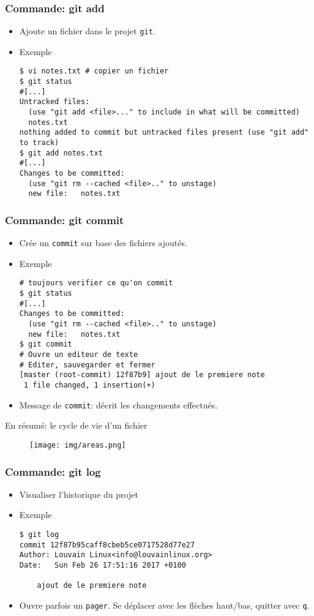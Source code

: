 \documentclass{beamer}
\begin{document}
\begin{frame}[fragile]
\frametitle{Commande: git add}
\begin{itemize}
    \item Ajoute un fichier dans le projet \texttt{git}.
    \item Exemple
\begin{lstlisting}
$ vi notes.txt # copier un fichier
$ git status
#[...]
Untracked files:
  (use "git add <file>..." to include in what will be committed)
  notes.txt
nothing added to commit but untracked files present (use "git add" to track)
$ git add notes.txt
#[...]
Changes to be committed:
  (use "git rm --cached <file>.." to unstage)
  new file:   notes.txt
\end{lstlisting}
\end{itemize}
\end{frame}

\begin{frame}[fragile]
\frametitle{Commande: git commit}
\begin{itemize}
    \item Crée un \texttt{commit} sur base des fichiers ajoutés.
    \item Exemple
\begin{lstlisting}
# toujours verifier ce qu'on commit
$ git status
#[...]
Changes to be committed:
  (use "git rm --cached <file>.." to unstage)
  new file:   notes.txt
$ git commit
# Ouvre un editeur de texte
# Editer, sauvegarder et fermer
[master (root-commit) 12f87b9] ajout de le premiere note
 1 file changed, 1 insertion(+)
\end{lstlisting}
\item Message de \texttt{commit}: décrit les changements effectués.
\end{itemize}
\end{frame}

\begin{frame}{En résumé: le cycle de vie d'un fichier}
\begin{figure}
    \centering
    \texttt{[image: img/areas.png]}
\end{figure}
\end{frame}

\begin{frame}[fragile]
\frametitle{Commande: git log}

\begin{itemize}
    \item Visualiser l'historique du projet
    \item Exemple
\begin{lstlisting}
$ git log
commit 12f87b95caff8cbeb5ce0717528d77e27
Author: Louvain Linux<info@louvainlinux.org>
Date:   Sun Feb 26 17:51:16 2017 +0100

    ajout de le premiere note
\end{lstlisting}
    \item Ouvre parfois un \texttt{pager}. Se déplacer avec les flèches haut/bas, quitter avec \texttt{q}.
\end{itemize}
\end{frame}
\end{document}
